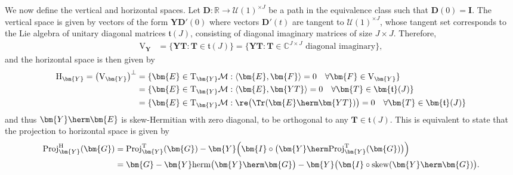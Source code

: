 We now define the vertical and horizontal spaces. Let $\bm{D}:\mathbb{R}\to\mathcal{U}(1)^{\times J}$ be a path in the equivalence class such that $\bm{D}(0)=\bm{I}$. 
The vertical space is given by vectors of the form $\bm{YD}'(0)$ where vectors $\bm{D}'(t)$ are tangent to $\mathcal{U}(1)^{\times J}$, whose tangent set corresponds to the Lie algebra of unitary diagonal matrices $\bm{\mathfrak{t}}(J)$, consisting of diagonal imaginary matrices of size 
$J\times J$. 
Therefore, 
\begin{align}
	\mathrm{V}_{\bm{Y}}&=\big\{\bm{YT}:\bm{T}\in\bm{\mathfrak{t}}(J)\big\}
	=\{\bm{YT}:\bm{T}\in\mathbb{C}^{J \times J}\text{ diagonal imaginary}\},
\end{align}
and the horizontal space is then given by
\begin{align}
	\mathrm{H}_{\bm{Y}}=\big(\mathrm{V}_{\bm{Y}}\big)^{\perp}
	&=\{\bm{E}\in\mathrm{T}_{\bm{Y}}\mathcal{M}:\langle \bm{E},\bm{F}\rangle=0\quad\forall\bm{F}\in\mathrm{V}_{\bm{Y}}\}\nonumber\\
	&=\{\bm{E}\in\mathrm{T}_{\bm{Y}}\mathcal{M}:\langle \bm{E},\bm{YT}\rangle=0\quad\forall\bm{T}\in\bm{\mathfrak{t}}(J)\}\nonumber\\
	&=\{\bm{E}\in\mathrm{T}_{\bm{Y}}\mathcal{M}: \re\big(\Tr(\bm{E}\herm
	\bm{ YT})\big)=0\quad\forall\bm{T}\in\bm{\mathfrak{t}}(J)\}
\end{align}
and thus $\bm{Y}\herm
\bm{E}$ is skew-Hermitian with zero diagonal, to be orthogonal to any $\bm{T}\in\mathfrak{t}(J)$. 
This is equivalent to state that the projection to horizontal space is given by
\begin{align}
	\mathrm{Proj}_{\bm{Y}}^{\mathrm{H}}(\bm{G})
	&=\mathrm{Proj}_{\bm{Y}}^{\mathrm{T}}(\bm{G})
	-\bm{Y}\Big(\bm{I}\circ\big(\bm{Y}\herm
	\mathrm{Proj}_{\bm{Y}}^{\mathrm{T}}(\bm{G})\big)\Big)\nonumber\\
	&=\bm{G}-\bm{Y}\mathrm{herm}\big(\bm{Y}\herm
	\bm{G}\big)
	-\bm{Y}\big(\bm{I}\circ\mathrm{skew}(\bm{Y}\herm
	\bm{G})\big).
\end{align}

